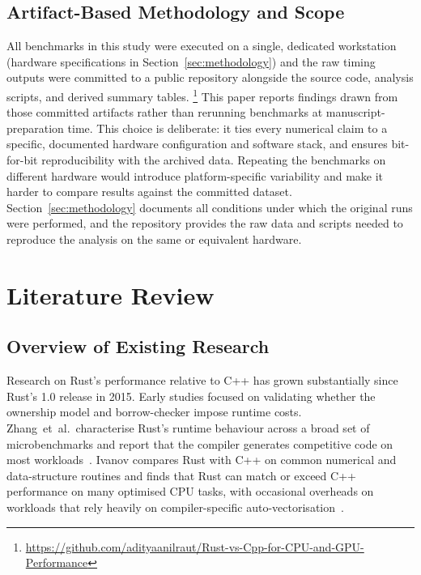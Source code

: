 \documentclass{article}
\begin{document}
\subsection{Artifact-Based Methodology and Scope}

All benchmarks in this study were executed on a single, dedicated workstation
(hardware specifications in Section~\ref{sec:methodology}) and the raw timing
outputs were committed to a public repository alongside the source code,
analysis scripts, and derived summary tables.%
\footnote{\url{https://github.com/adityaanilraut/Rust-vs-Cpp-for-CPU-and-GPU-Performance}}
This paper reports findings drawn from those committed artifacts rather than
rerunning benchmarks at manuscript-preparation time.
This choice is deliberate: it ties every numerical claim to a specific,
documented hardware configuration and software stack, and ensures
bit-for-bit reproducibility with the archived data.
Repeating the benchmarks on different hardware would introduce
platform-specific variability and make it harder to compare results against
the committed dataset.
Section~\ref{sec:methodology} documents all conditions under which the
original runs were performed, and the repository provides the raw data and
scripts needed to reproduce the analysis on the same or equivalent hardware.

\section{Literature Review}

\subsection{Overview of Existing Research}

Research on Rust's performance relative to C++ has grown substantially since
Rust's 1.0 release in 2015.
Early studies focused on validating whether the ownership model and
borrow-checker impose runtime costs.
Zhang~et~al.\ characterise Rust's runtime behaviour across a broad set of
microbenchmarks and report that the compiler generates competitive code on
most workloads~\cite{zhang2022rust}.
Ivanov compares Rust with C++ on common numerical and data-structure routines
and finds that Rust can match or exceed C++ performance on many optimised CPU
tasks, with occasional overheads on workloads that rely heavily on
compiler-specific auto-vectorisation~\cite{ivanov2022rust}.
\end{document}
